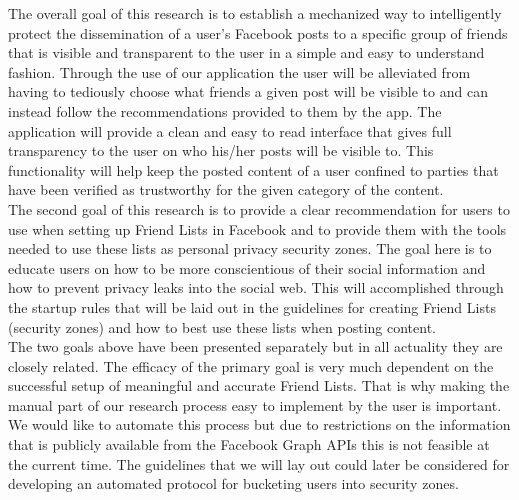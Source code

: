 \tab The overall goal of this research is to establish a mechanized way to intelligently protect the dissemination of a user's Facebook posts to a specific group of friends that is visible and transparent to the user in a simple and easy to understand fashion. Through the use of our application the user will be alleviated from having to tediously choose what friends a given post will be visible to and can instead follow the recommendations provided to them by the app. The application will provide a clean and easy to read interface that gives full transparency to the user on who his/her posts will be visible to. This functionality will help keep the posted content of a user confined to parties that have been verified as trustworthy for the given category of the content. 
\\
\tab The second goal of this research is to provide a clear recommendation for users to use when setting up Friend Lists in Facebook and to provide them with the tools needed to use these lists as personal privacy security zones. The goal here is to educate users on how to be more conscientious of their social information and how to prevent privacy leaks into the social web. This will accomplished through the startup rules that will be laid out in the guidelines for creating Friend Lists (security zones) and how to best use these lists when posting content. 
\\
\tab The two goals above have been presented separately but in all actuality they are closely related. The efficacy of the primary goal is very much dependent on the successful setup of meaningful and accurate Friend Lists. That is why making the manual part of our research process easy to implement by the user is important. We would like to automate this process but due to restrictions on the information that is publicly available from the Facebook Graph APIs this is not feasible at the current time. The guidelines that we will lay out could later be considered for developing an automated protocol for bucketing users into security zones. 
